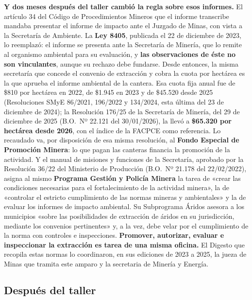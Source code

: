 \begin{cautela}
\textbf{Y dos meses después del taller cambió la regla sobre esos informes.} El artículo 34 del Código de Procedimientos Mineros que el informe transcribe mandaba presentar el informe de impacto ante el Juzgado de Minas, con vista a la Secretaría de Ambiente. La \textbf{Ley 8405}, publicada el 22 de diciembre de 2023, lo reemplazó: el informe se presenta ante la Secretaría de Minería, que lo remite al organismo ambiental para su evaluación, y \textbf{las observaciones de éste no son vinculantes}, aunque su rechazo debe fundarse. Desde entonces, la misma secretaría que concede el convenio de extracción y cobra la cuota por hectárea es la que aprueba el informe ambiental de la cantera. Esa cuota fija anual fue de \$810 por hectárea en 2022, de \$1.945 en 2023 y de \$45.520 desde 2025 (Resoluciones SMyE 86/2021, 196/2022 y 134/2024, esta última del 23 de diciembre de 2024); la Resolución 176/25 de la Secretaría de Minería, del 29 de diciembre de 2025 (B.O.\ Nº 22.121 del 30/01/2026), la llevó a \textbf{\$65.320 por hectárea desde 2026}, con el índice de la FACPCE como referencia. Lo recaudado va, por disposición de esa misma resolución, al \textbf{Fondo Especial de Promoción Minera}: lo que pagan las canteras financia la promoción de la actividad. Y el manual de misiones y funciones de la Secretaría, aprobado por la Resolución 36/22 del Ministerio de Producción (B.O.\ Nº 21.178 del 22/02/2022), asigna al mismo \textbf{Programa Gestión y Policía Minera} la tarea de «crear las condiciones necesarias para el fortalecimiento de la actividad minera», la de «controlar el estricto cumplimiento de las normas mineras y ambientales» y la de evaluar los informes de impacto ambiental. Su Subprograma Áridos asesora a los municipios «sobre las posibilidades de extracción de áridos en su jurisdicción, mediante los convenios pertinentes» y, a la vez, debe velar por el cumplimiento de la norma con controles e inspecciones. \textbf{Promover, autorizar, evaluar e inspeccionar la extracción es tarea de una misma oficina.} El Digesto que recopila estas normas lo coordinaron, en sus ediciones de 2023 a 2025, la jueza de Minas que tramita este amparo y la secretaria de Minería y Energía.
\end{cautela}

\subsection*{Después del taller}

